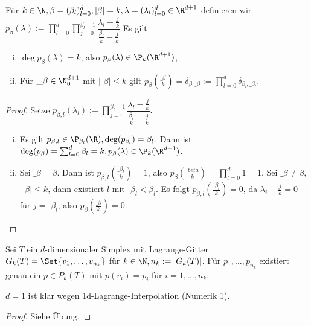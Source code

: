 
\begin{lem} \label{3.68}
	Für $k \in \N, \beta = (\beta_l)_{l=0}^d, |\beta| = k, \lambda = (\lambda_l)_{l=0}^d \in \R^{d+1}$ definieren wir
	\begin{math}
		p_\beta(\lambda)
		:= \prod_{l=0}^d \prod_{j=0}^{\beta_l - 1} \dfrac{\lambda_l - \frac{j}{k}}{\frac{\beta_l}{k} - \frac{j}{k}}
	\end{math}
	Es gilt
	\begin{enumerate}[i)]
		\item
			$\deg p_\beta(\lambda) = k$, also $p_\beta(\lambda) \in \P_k(\R^{d+1})$,
		\item
			Für $\_\beta \in \N_0^{d+1}$ mit $|\_\beta| \le k$ gilt $p_\beta(\frac{\_\beta}{k}) = \delta_{\beta,\_\beta} := \prod_{l = 0}^d \delta_{\beta_l, \_\beta_l}$.
	\end{enumerate}
	\begin{proof}
		Setze
		\begin{math}
			p_{\beta,l}(\lambda_l) := \prod_{j=0}^{\beta_l - 1} \dfrac{\lambda_l - \frac{j}{k}}{\frac{\beta_l}{k}-\frac{j}{k}}.
		\end{math}
		\begin{enumerate}[i)]
			\item
				Es gilt $p_{\beta,l} \in \P_{\beta_l}(\R), \deg(p_{\beta_l}) = \beta_l$.
				Dann ist $\deg(p_\beta) = \sum_{l=0}^d \beta_l = k, p_\beta(\lambda) \in \P_k(\R^{d+1})$.
			\item
				Sei $\_\beta = \beta$.
				Dann ist $p_{\beta,l}(\frac{\_\beta_l}{k}) = 1$, also $p_\beta(\frac{\_beta}{k}) = \prod_{l=0}^d 1 = 1$.
				Sei $\_\beta \neq \beta$, $|\_\beta| \le k$, dann existiert $l$ mit $\_\beta_l < \beta_l$.
				Es folgt $p_{\beta, l}(\frac{\_\beta_l}{k}) = 0$, da $\lambda_i - \frac{j}{k} = 0$ für $j = \_\beta_l$, also $p_\beta(\frac{\_\beta}{k}) = 0$.
		\end{enumerate}
	\end{proof}
\end{lem}

\begin{st} \label{3.69}
	Sei $T$ ein $d$-dimensionaler Simplex mit Lagrange-Gitter $G_k(T) = \Set{v_1, \dotsc, v_{n_k}}$ für $k \in \N, n_k := |G_k(T)|$.
	Für $p_1, \dotsc, p_{n_k}$ existiert genau ein $p \in P_k(T)$ mit $p(v_i) = p_i$ für $i = 1, \dotsc, n_k$.
	\begin{note}
		$d = 1$ ist klar wegen 1d-Lagrange-Interpolation (Numerik 1).
	\end{note}
	\begin{proof}
		Siehe Übung.
	\end{proof}
\end{st}

